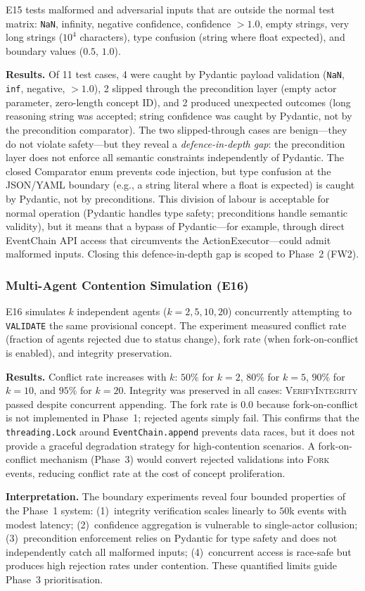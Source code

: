 E15 tests malformed and adversarial inputs that are outside the normal test matrix: \texttt{NaN}, infinity, negative confidence, confidence $> 1.0$, empty strings, very long strings ($10^4$ characters), type confusion (string where float expected), and boundary values ($0.5$, $1.0$).

\textbf{Results.} Of 11 test cases, 4 were caught by Pydantic payload validation (\texttt{NaN}, \texttt{inf}, negative, $> 1.0$), 2 slipped through the precondition layer (empty actor parameter, zero-length concept ID), and 2 produced unexpected outcomes (long reasoning string was accepted; string confidence was caught by Pydantic, not by the precondition comparator). The two slipped-through cases are benign---they do not violate safety---but they reveal a \emph{defence-in-depth gap}: the precondition layer does not enforce all semantic constraints independently of Pydantic. The closed \textsf{Comparator} enum prevents code injection, but type confusion at the JSON/YAML boundary (e.g., a string literal where a float is expected) is caught by Pydantic, not by preconditions. This division of labour is acceptable for normal operation (Pydantic handles type safety; preconditions handle semantic validity), but it means that a bypass of Pydantic---for example, through direct EventChain API access that circumvents the ActionExecutor---could admit malformed inputs. Closing this defence-in-depth gap is scoped to Phase~2 (FW2).

\subsubsection{Multi-Agent Contention Simulation (E16)}

E16 simulates $k$ independent agents ($k = 2, 5, 10, 20$) concurrently attempting to \texttt{VALIDATE} the same provisional concept. The experiment measured conflict rate (fraction of agents rejected due to status change), fork rate (when fork-on-conflict is enabled), and integrity preservation.

\textbf{Results.} Conflict rate increases with $k$: $50\%$ for $k=2$, $80\%$ for $k=5$, $90\%$ for $k=10$, and $95\%$ for $k=20$. Integrity was preserved in all cases: \textsc{VerifyIntegrity} passed despite concurrent appending. The fork rate is $0.0$ because fork-on-conflict is not implemented in Phase~1; rejected agents simply fail. This confirms that the \texttt{threading.Lock} around \texttt{EventChain.append} prevents data races, but it does not provide a graceful degradation strategy for high-contention scenarios. A fork-on-conflict mechanism (Phase~3) would convert rejected validations into \textsc{Fork} events, reducing conflict rate at the cost of concept proliferation.

\textbf{Interpretation.} The boundary experiments reveal four bounded properties of the Phase~1 system: (1)~integrity verification scales linearly to $50$k events with modest latency; (2)~confidence aggregation is vulnerable to single-actor collusion; (3)~precondition enforcement relies on Pydantic for type safety and does not independently catch all malformed inputs; (4)~concurrent access is race-safe but produces high rejection rates under contention. These quantified limits guide Phase~3 prioritisation.
